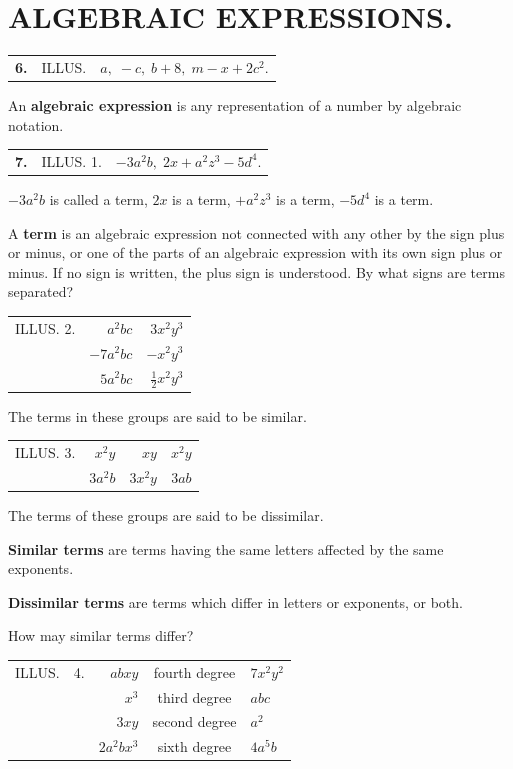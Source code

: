 \documentclass{book}
\begin{document}
\section*{ALGEBRAIC EXPRESSIONS.}

\begin{tabular}{cll}
\textbf{ 6.} & ILLUS. & $ a,\; -c,\; b + 8,\; m-x+2c^2.$
\end{tabular}

An \textbf{ algebraic expression} is any representation of a
number by algebraic notation.

\begin{tabular}{lll}
\textbf{ 7.} & ILLUS. 1.& $-3a^2b,\; 2x+a^2z^3-5d^4.$
\end{tabular}

$-3a^2b$ is called a term, $2x$ is a term, $+a^2z^3$ is a term,
$-5d^4$ is a term.

A \textbf{ term} is an algebraic expression not connected with any
other by the sign plus or minus, or one of the parts of an
algebraic expression with its own sign plus or minus. If no sign
is written, the plus sign is understood. By what signs are terms
separated?

\begin{tabular}{l r r}
ILLUS. 2.&$a^2bc$&$3x^2y^3$\\
&$-7a^2bc$&$-x^2y^3$\\
&$5a^2bc$&$\frac{1}{2}x^2y^3$
\end{tabular}

The terms in these groups are said to be similar.

\begin{tabular}{l r r r}
ILLUS. 3.& $x^2y$&$xy$&$x^2y$\\
&$3a^2b$&$3x^2y$&$3ab$\\
\end{tabular}

The terms of these groups are said to be dissimilar.

\textbf{ Similar terms} are terms having the same letters affected
by the same exponents.

\textbf{ Dissimilar terms} are terms which differ in letters or
exponents, or both.

How may similar terms differ?

\begin{tabular}{ccr@{....}c@{....}l}
ILLUS. & 4.& $abxy$ & fourth degree & $7x^2y^2$\\
           && $x^3$ & third degree &  $abc$\\
           &&$3xy$ & second degree & $a^2$\\
     && $2a^2bx^3$ & sixth degree &  $4a^5b$\\
\end{tabular}
\end{document}
